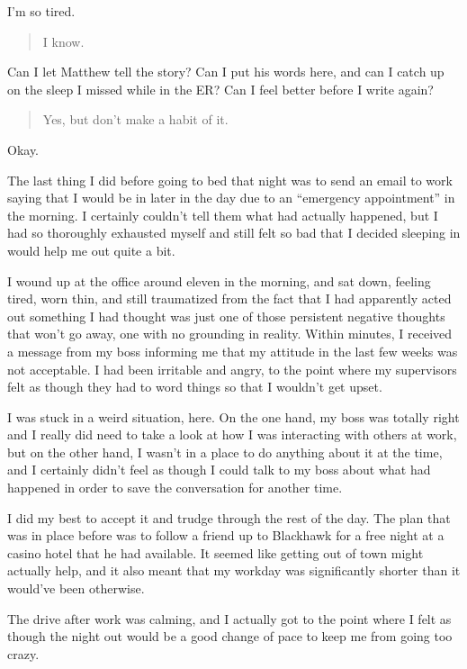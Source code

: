 I'm so tired.

\begin{quote}
I know.
\end{quote}

Can I let Matthew tell the story? Can I put his words here, and can I catch up on the sleep I missed while in the ER? Can I feel better before I write again?

\begin{quote}
Yes, but don't make a habit of it.
\end{quote}

Okay.

The last thing I did before going to bed that night was to send an email to work saying that I would be in later in the day due to an ``emergency appointment'' in the morning. I certainly couldn't tell them what had actually happened, but I had so thoroughly exhausted myself and still felt so bad that I decided sleeping in would help me out quite a bit.

I wound up at the office around eleven in the morning, and sat down, feeling tired, worn thin, and still traumatized from the fact that I had apparently acted out something I had thought was just one of those persistent negative thoughts that won't go away, one with no grounding in reality. Within minutes, I received a message from my boss informing me that my attitude in the last few weeks was not acceptable. I had been irritable and angry, to the point where my supervisors felt as though they had to word things so that I wouldn't get upset.

I was stuck in a weird situation, here. On the one hand, my boss was totally right and I really did need to take a look at how I was interacting with others at work, but on the other hand, I wasn't in a place to do anything about it at the time, and I certainly didn't feel as though I could talk to my boss about what had happened in order to save the conversation for another time.

I did my best to accept it and trudge through the rest of the day. The plan that was in place before was to follow a friend up to Blackhawk for a free night at a casino hotel that he had available. It seemed like getting out of town might actually help, and it also meant that my workday was significantly shorter than it would've been otherwise.

The drive after work was calming, and I actually got to the point where I felt as though the night out would be a good change of pace to keep me from going too crazy.

